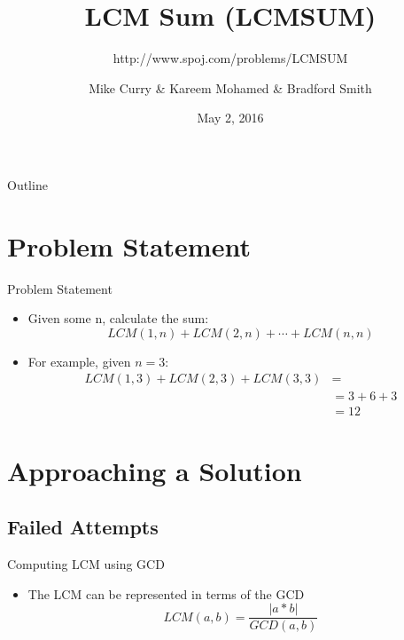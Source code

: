 \documentclass{beamer}
\title[LCMSUM]{LCM Sum (LCMSUM)}
\subtitle{http://www.spoj.com/problems/LCMSUM}
\author{Mike Curry \& Kareem Mohamed \& Bradford Smith}
\institute{CS 370}
\date{May 2, 2016}
\begin{document}
\begin{frame}
  \titlepage
\end{frame}

\begin{frame}{Outline}
  \tableofcontents
\end{frame}

\section{Problem Statement}

\begin{frame}{Problem Statement}
  \begin{itemize}
  \item Given some n, calculate the sum:
    \begin{equation*}
      \boxed{LCM(1, n) + LCM(2, n) + \cdots + LCM(n, n)}
    \end{equation*} \vspace{10mm}
  \item For example, given $n = 3$:
    \begin{align*}
      LCM(1, 3) + LCM(2, 3) + LCM(3, 3) &= \\
      &= 3 + 6 + 3 \\
        &= 12
    \end{align*}
  \end{itemize}
\end{frame}

\section{Approaching a Solution}

\subsection{Failed Attempts}

\begin{frame}{Computing LCM using GCD}
  \begin{itemize}
  \item The LCM can be represented in terms of the GCD
    \begin{equation*}
      \boxed{LCM(a, b) = \frac{|a * b|}{GCD(a, b)}}
    \end{equation*}
  \end{itemize}
\end{frame}
\end{document}
